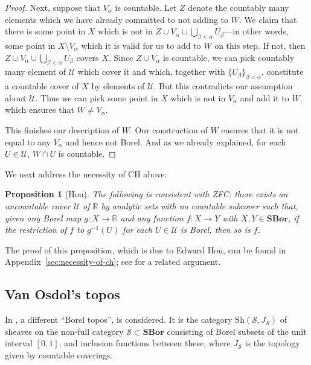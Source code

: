 \documentclass[11pt]{amsart}
\newcommand\cS{\mathcal{S}}
\newcommand\cU{\mathcal{U}}
\newcommand\I{^{-1}}
\newcommand\R{\mathbb{R}}
\newcommand\SBor{\mathbf{SBor}}
\newcommand\set[2][]{#1\{{#2}#1\}}
\newcommand\Sh{\mathrm{Sh}}
\theoremstyle{definition}
\theoremstyle{remark}
\theoremstyle{plain}
\newtheorem{propn}[defn]{Proposition}
\begin{document}
\begin{proof}
  Next, suppose that $V_\alpha$ is countable.
  Let $Z$ denote the countably many elements which we have already committed to not adding to $W$.
  We claim that there is some point in $X$ which is not in $Z\cup V_\alpha \cup \bigcup_{\beta < \alpha}U_\beta$---in other words, some point in $X \setminus V_\alpha$ which it is valid for us to add to $W$ on this step.
  If not, then $Z \cup V_\alpha \cup \bigcup_{\beta < \alpha}U_\beta$ covers $X$.
  Since $Z \cup V_\alpha$ is countable, we can pick countably many element of $\cU$ which cover it and which, together with $\set{U_\beta}_{\beta < \alpha}$, constitute a countable cover of $X$ by elements of $\cU$.
  But this contradicts our assumption about $\cU$.
  Thus we can pick some point in $X$ which is not in $V_\alpha$ and add it to $W$, which ensures that $W \neq V_\alpha$.

  This finishes our description of $W$.
  Our construction of $W$ ensures that it is not equal to any $V_\alpha$ and hence not Borel.
  And as we already explained, for each $U \in \cU$, $W\cap U$ is countable.
\end{proof}

We next address the necessity of CH above:
\begin{propn}[Hou]
\label{propn:not_canonical}
  The following is consistent with ZFC:
  there exists an uncountable cover \( \cU \) of \( \R \) by analytic sets with no countable subcover such that, given any Borel map \( g \colon X \to \R \) and any function \( f \colon X \to Y \) with \( X,Y \in \SBor \), if the restriction of \( f \) to \( g\I(U) \) for each \( U \in \cU \) is Borel, then so is \( f \).
\end{propn}
The proof of this proposition, which is due to Edward Hou, can be found in Appendix~\ref{sec:necessity-of-ch}; see \cite{hou-mo-forcing-argument} for a related argument.

\subsection{Van Osdol's topos}\label{subsec:van-osdol-topos}
In \cite{van-osdol-borel-topos}, a different ``Borel topos'', is considered.
It is the category \( \Sh(\cS, J_{\cS}) \) of sheaves on the non-full category \( \cS \subset \SBor \) consisting of Borel subsets of the unit interval \( [0,1] \), and inclusion functions between these, where \( J_{\cS} \) is the topology given by countable coverings.
\end{document}
